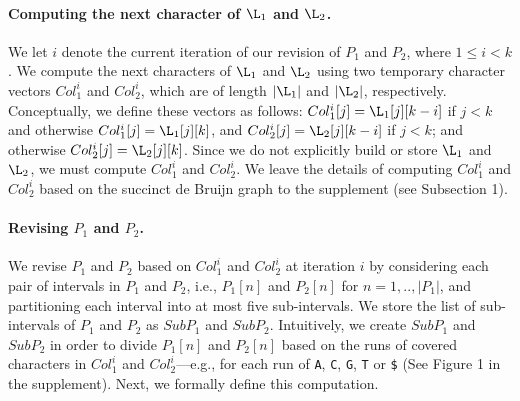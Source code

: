 \paragraph{Computing the next character of $\L_1$ and $\L_2$.}   

We let $i$ denote the current iteration of our revision of $P_1$ and $P_2$, where $1 \leq i < k$. We compute the next characters of $\L_1$ and $\L_2$ using two temporary character vectors $Col_1^i$ and $Col_2^i$, which are of length $|\L_1|$ and $|\L_2|$, respectively.    Conceptually, we define these vectors as follows: $Col_1^i[j] = \L_1[j][k-i]$ if $j < k$ and otherwise $Col_1^i[j] = \L_1[j][k]$, and $Col_2^i[j] = \L_2[j][k-i]$ if $j < k$; and otherwise $Col_2^i[j] =  \L_2[j][k]$. Since we do not explicitly build or store $\L_1$ and $\L_2$, we must compute $Col_1^i$ and $Col_2^i$.  We leave the details of computing $Col_1^i$ and $Col_2^i$ based on the succinct de Bruijn graph to the supplement (see Subsection 1).

 


\paragraph{Revising $P_1$ and $P_2$.}
We revise $P_1$ and $P_2$ based on $Col_1^i$ and $Col_2^i$ at iteration $i$ by considering each pair of intervals in $P_1$ and $P_2$, i.e., $P_1[n]$ and $P_2[n]$ for $n = 1,.., |P_1|$, and partitioning each interval into at most five sub-intervals.  We store the list of sub-intervals of $P_1$ and $P_2$ as $SubP_1$ and $SubP_2$. Intuitively, we create $SubP_1$ and $SubP_2$ in order to divide $P_1[n]$ and $P_2[n]$ based on the runs of covered characters in  $Col_1^i$ and  $Col_2^i$---e.g., for each run of {\tt A}, {\tt C}, {\tt G}, {\tt T} or {\tt \$} (See Figure 1 in the supplement). Next, we formally define this computation.

